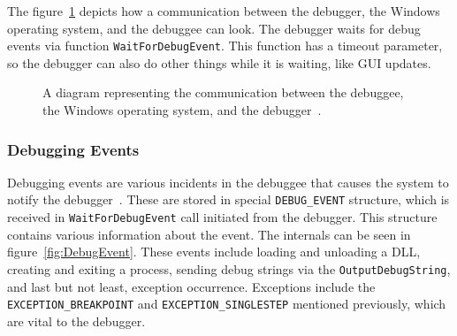 The figure~\ref{fig:win32debugger} depicts how a communication between the
debugger, the Windows operating system, and the debuggee can look. The debugger
waits for debug events via function \texttt{WaitForDebugEvent}. This
function has a timeout parameter, so the debugger can also do other things
while it is waiting, like GUI updates.

\begin{figure}
    \centering
    \caption{A diagram representing the communication between the debuggee, the
    Windows operating system, and the debugger~\cite{windows-dbg-api-rev}.}
    \label{fig:win32debugger}
\end{figure}
 
\subsubsection*{Debugging Events}\label{section:Debug Events}
Debugging events are various incidents in the debuggee that causes the system
to notify the debugger~\cite{windows-msdn-debug-events}. These are stored in
special \texttt{DEBUG_EVENT} structure, which is received in
\texttt{WaitForDebugEvent} call initiated from the debugger. This
structure contains various information about the event. The internals can be
seen in figure~\ref{fig:DebugEvent}. These events include loading and unloading
a DLL, creating and exiting a process, sending debug strings via the
\texttt{OutputDebugString}, and last but not least, exception
occurrence. Exceptions include the \verb|EXCEPTION_BREAKPOINT| and
\verb|EXCEPTION_SINGLESTEP| mentioned previously, which are vital to the
debugger.

